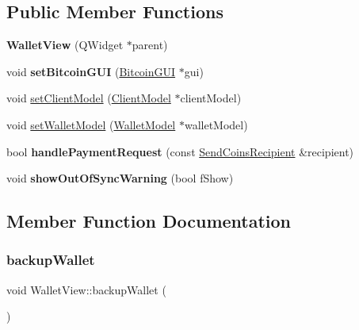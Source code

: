 \subsection*{Public Member Functions}
\begin{DoxyCompactItemize}
\item 
\mbox{\label{class_wallet_view_a015da635646a47196bbcd819f7e01e7c}} 
{\bfseries Wallet\+View} (Q\+Widget $\ast$parent)
\item 
\mbox{\label{class_wallet_view_a4405b0cf33d31ea663cb1e5047ae1d97}} 
void {\bfseries set\+Bitcoin\+G\+UI} (\mbox{\hyperlink{class_bitcoin_g_u_i}{Bitcoin\+G\+UI}} $\ast$gui)
\item 
void \mbox{\hyperlink{class_wallet_view_a46d9a8d93adfdcc29cae9ff0d44c313e}{set\+Client\+Model}} (\mbox{\hyperlink{class_client_model}{Client\+Model}} $\ast$client\+Model)
\item 
void \mbox{\hyperlink{class_wallet_view_a0a37ff693a4f9c1e5ddc23f9cd3913be}{set\+Wallet\+Model}} (\mbox{\hyperlink{class_wallet_model}{Wallet\+Model}} $\ast$wallet\+Model)
\item 
\mbox{\label{class_wallet_view_a0ae21d91a9d7755026ce2a6846cef68d}} 
bool {\bfseries handle\+Payment\+Request} (const \mbox{\hyperlink{class_send_coins_recipient}{Send\+Coins\+Recipient}} \&recipient)
\item 
\mbox{\label{class_wallet_view_af3ed06b191b6d933788f32ed2daa5fae}} 
void {\bfseries show\+Out\+Of\+Sync\+Warning} (bool f\+Show)
\end{DoxyCompactItemize}


\subsection{Member Function Documentation}
\mbox{\label{class_wallet_view_a9800d793b552076b4207276d9e08c8b6}} 
\subsubsection{\texorpdfstring{backup\+Wallet}{backupWallet}}
{\footnotesize\ttfamily void Wallet\+View\+::backup\+Wallet (\begin{DoxyParamCaption}{ }\end{DoxyParamCaption})\hspace{0.3cm}{\ttfamily [slot]}}

